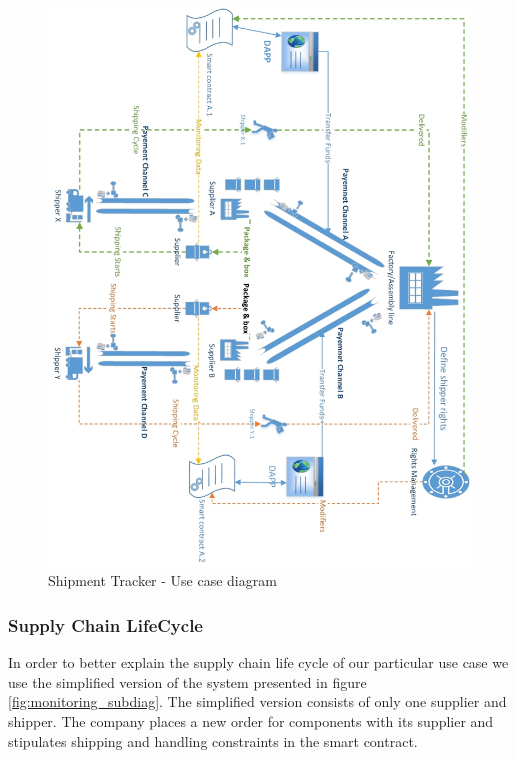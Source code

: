 \begin{figure}[h]
	\centering
    \includegraphics[width=180mm,scale=1]{figs/AbstractUC-flip}
	\caption{Shipment Tracker - Use case diagram}
	\label{fig:UseCase}
\end{figure}

\clearpage


\subsubsection{Supply Chain LifeCycle}
In order to better explain the supply chain life cycle of our particular use case we use the simplified version of the system presented in figure \ref{fig:monitoring_subdiag}. The simplified version consists of only one supplier and shipper. The company places a new order for components with its supplier and stipulates shipping and handling constraints in the smart contract. 

